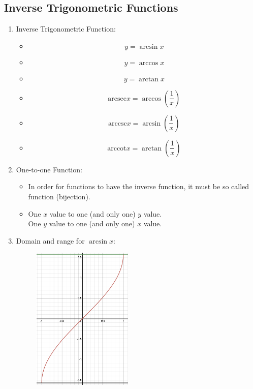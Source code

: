 \documentclass[12pt, a4paper]{article}
\begin{document}
\subsection{Inverse Trigonometric Functions}
\begin{enumerate}
  \item Inverse Trigonometric Function: 
  \begin{itemize}
    \item $$y=\arcsin{x}$$
    \item $$y=\arccos{x}$$
    \item $$y=\arctan{x}$$
    \item $$\text{arcsec}x=\arccos{\left(\frac{1}{x}\right)}$$
    \item $$\text{arccsc}x=\arcsin{\left(\frac{1}{x}\right)}$$
    \item $$\text{arccot}x=\arctan{\left(\frac{1}{x}\right)}$$
  \end{itemize}
  \item One-to-one Function: 
  \begin{itemize}
    \item In order for functions to have the inverse function, it must be so called \textbf{\color{red}{one-to-one}} function (bijection). 
    \item One $x$ value to one (and only one) $y$ value.\\
    One $y$ value to one (and only one) $x$ value. 
  \end{itemize}
  \item Domain and range for $\arcsin{x}$: 
  \begin{itemize}
    \begin{figure}[H]
      \centering
      \includegraphics[width=0.45\textwidth]{Fig.31.jpg}

\end{figure}
\end{itemize}
\end{enumerate}
\end{document}
